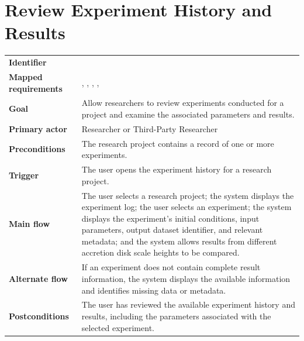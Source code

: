 \section{Review Experiment History and Results}
\begin{tabularx}{\linewidth}{L{3.5cm}Y}
\toprule
\textbf{Identifier} & \\
\textbf{Mapped requirements} & , , , , \\
\textbf{Goal} & Allow researchers to review experiments conducted for a project and examine the associated parameters and results.\\
\textbf{Primary actor} & Researcher or Third-Party Researcher\\
\textbf{Preconditions} & The research project contains a record of one or more experiments.\\
\textbf{Trigger} & The user opens the experiment history for a research project.\\
\textbf{Main flow} & The user selects a research project; the system displays the experiment log; the user selects an experiment; the system displays the experiment's initial conditions, input parameters, output dataset identifier, and relevant metadata; and the system allows results from different accretion disk scale heights to be compared.\\
\textbf{Alternate flow} & If an experiment does not contain complete result information, the system displays the available information and identifies missing data or metadata.\\
\textbf{Postconditions} & The user has reviewed the available experiment history and results, including the parameters associated with the selected experiment.\\
\bottomrule
\end{tabularx}


